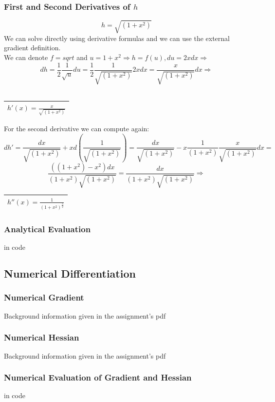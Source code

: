 \documentclass[12pt]{article}
\newcommand{\rectres}[1]{
\begin{center}
\begin{tabular}{ |c| }
\hline
 #1\\
\hline
\end{tabular}
\end{center}
}
\begin{document}
\subsubsection{First and Second Derivatives of $h$}
$$h=\sqrt{(1+x^2)}$$
We can solve directly using derivative formulas and we can use the external gradient definition.\\
We can denote $f=sqrt$ and $u=1+x^2 \Rightarrow h=f(u), du=2xdx \Rightarrow$
$$dh=\frac{1}{2}\frac{1}{\sqrt{u}}du=\frac{1}{2}\frac{1}{\sqrt{(1+x^2)}}2xdx=\frac{x}{\sqrt{(1+x^2)}}dx\Rightarrow$$\\
\rectres{$h'(x)=\frac{x}{\sqrt{(1+x^2)}}$}
For the second derivative we can compute again:\\
$$dh'=\frac{dx}{\sqrt{(1+x^2)}}+xd(\frac{1}{\sqrt{(1+x^2)}})=\frac{dx}{\sqrt{(1+x^2)}}-x\frac{1}{(1+x^2)}\frac{x}{\sqrt{(1+x^2)}}dx=$$
$$\frac{((1+x^2)-x^2)dx}{(1+x^2)\sqrt{(1+x^2)}}=\frac{dx}{(1+x^2)\sqrt{(1+x^2)}} \Rightarrow$$
\rectres{$h''(x)=\frac{1}{(1+x^2)^{\frac{3}{2}}}$}

\subsubsection{Analytical Evaluation}
in code

\subsection{Numerical Differentiation}
\subsubsection{Numerical Gradient}
Background information given in the assignment's pdf
\subsubsection{Numerical Hessian}
Background information given in the assignment's pdf
\subsubsection{Numerical Evaluation of Gradient and Hessian}
in code

\newpage
\end{document}
